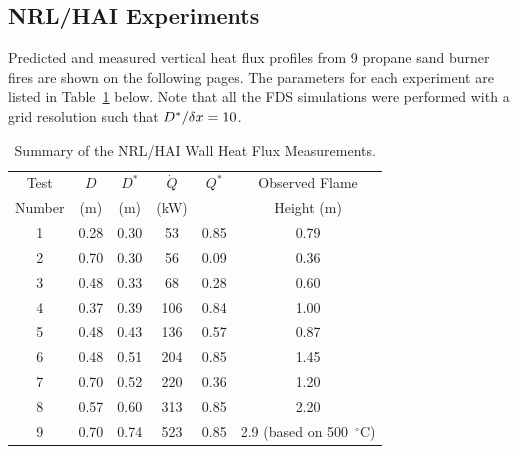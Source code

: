 \clearpage



\subsection{NRL/HAI Experiments}

Predicted and measured vertical heat flux profiles from 9 propane sand burner fires are shown on the following pages. The parameters for each
experiment are listed in Table~\ref{NRL/HAI_Parameters} below. Note that all the FDS simulations were performed with a grid resolution such that
$D^*/\delta x=10$.

\begin{table}[ht]
\caption{Summary of the NRL/HAI Wall Heat Flux Measurements. }
\begin{center}
\begin{tabular}{|c|c|c|c|c|c|}
\hline
Test     & $D$     & $D^*$      & $\dot{Q}$   & $Q^*$   & Observed  Flame \\
Number   & (m)     & (m)        & (kW)        &         & Height (m)      \\ \hline \hline
1        & 0.28    & 0.30       &  53         & 0.85    & 0.79            \\ \hline
2        & 0.70    & 0.30       &  56         & 0.09    & 0.36            \\ \hline
3        & 0.48    & 0.33       &  68         & 0.28    & 0.60            \\ \hline
4        & 0.37    & 0.39       &  106        & 0.84    & 1.00            \\ \hline
5        & 0.48    & 0.43       &  136        & 0.57    & 0.87            \\ \hline
6        & 0.48    & 0.51       &  204        & 0.85    & 1.45            \\ \hline
7        & 0.70    & 0.52       &  220        & 0.36    & 1.20            \\ \hline
8        & 0.57    & 0.60       &  313        & 0.85    & 2.20            \\ \hline
9        & 0.70    & 0.74       &  523        & 0.85    & 2.9 (based on 500~$^\circ$C)       \\ \hline
\end{tabular}
\end{center}
\label{NRL/HAI_Parameters}
\end{table}

\newpage

